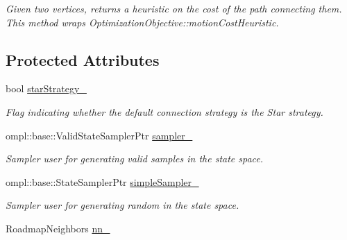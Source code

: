 \begin{DoxyCompactItemize}
\begin{DoxyCompactList}\small\item\em \-Given two vertices, returns a heuristic on the cost of the path connecting them. \-This method wraps \-Optimization\-Objective\-::motion\-Cost\-Heuristic. \end{DoxyCompactList}\end{DoxyCompactItemize}
\subsection*{\-Protected \-Attributes}
\begin{DoxyCompactItemize}
\item 
\hypertarget{class_f_i_r_m_a1381ddffa42b0bf2d36dc9c6d9d1da9d}{bool \hyperlink{class_f_i_r_m_a1381ddffa42b0bf2d36dc9c6d9d1da9d}{star\-Strategy\-\_\-}}\label{class_f_i_r_m_a1381ddffa42b0bf2d36dc9c6d9d1da9d}

\begin{DoxyCompactList}\small\item\em \-Flag indicating whether the default connection strategy is the \-Star strategy. \end{DoxyCompactList}\item 
\hypertarget{class_f_i_r_m_af4307c058abb03b3a84c5c60e849c191}{ompl\-::base\-::\-Valid\-State\-Sampler\-Ptr \hyperlink{class_f_i_r_m_af4307c058abb03b3a84c5c60e849c191}{sampler\-\_\-}}\label{class_f_i_r_m_af4307c058abb03b3a84c5c60e849c191}

\begin{DoxyCompactList}\small\item\em \-Sampler user for generating valid samples in the state space. \end{DoxyCompactList}\item 
\hypertarget{class_f_i_r_m_af71a0e86b8a99f9eaa687f161d8d68e1}{ompl\-::base\-::\-State\-Sampler\-Ptr \hyperlink{class_f_i_r_m_af71a0e86b8a99f9eaa687f161d8d68e1}{simple\-Sampler\-\_\-}}\label{class_f_i_r_m_af71a0e86b8a99f9eaa687f161d8d68e1}

\begin{DoxyCompactList}\small\item\em \-Sampler user for generating random in the state space. \end{DoxyCompactList}\item 
\hypertarget{class_f_i_r_m_aeed6858c0216ed9fc49f02e4aafc4443}{\-Roadmap\-Neighbors \hyperlink{class_f_i_r_m_aeed6858c0216ed9fc49f02e4aafc4443}{nn\-\_\-}}\label{class_f_i_r_m_aeed6858c0216ed9fc49f02e4aafc4443}


\end{DoxyCompactItemize}
